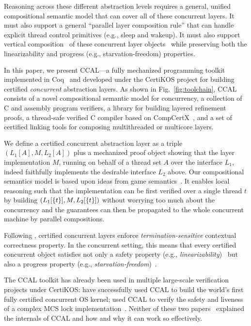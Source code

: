 Reasoning across these different abstraction levels requires a
general, unified compositional semantic model that can cover all of
these concurrent layers. It must also support a general ``parallel
layer composition rule'' that can handle explicit thread control
primitives (e.g., sleep and wakeup). It must also support
vertical composition~\cite{ospp11} of these concurrent layer
objects~\cite{Herlihy08book} while preserving both the
linearizability and progress (e.g., starvation-freedom) properties.


In this paper, we present CCAL---a fully mechanized
programming toolkit implemented in
Coq~\cite{coq} and developed under the CertiKOS project \cite{certikos-osdi16} for building certified {\em concurrent}
abstraction layers.  
As shown in Fig.~\ref{fig:toolchain}, CCAL consists of a novel
compositional semantic model for concurrency, a collection of C and
assembly program verifiers, a library for building layered refinement
proofs, a thread-safe verified C compiler based on
CompCertX~\cite{dscal15}, and a set of certified linking tools for
composing multithreaded or multicore layers.

We define a certified  concurrent abstraction layer
as a triple $(L_1[A],M,L_2[A])$ plus a mechanized proof object showing that the layer implementation $M$, running on behalf of a thread set $A$ over the interface $L_1$, indeed faithfully implements the desirable interface $L_2$
above. Our compositional semantics model  is based upon
ideas from game semantics~\cite{gsinvite}. It
enables local reasoning such that  the implementation can be first verified over a single thread $t$ by building $(L_1[\{t\}], M,L_2[\{t\}])$ without worrying too much about the concurrency
and the guarantees can then be propagated to the whole concurrent machine by parallel compositions. 

Following \citet{dscal15}, certified concurrent layers enforce {\em
  termination-sensitive} contextual correctness property. In the
concurrent setting, this means that every certified concurrent object
satisfies not only a safety property (e.g., {\em
  linearizability})~\cite{herlihy90,filipovic10} but also a progress
property (e.g., {\em starvation-freedom})~\cite{liang13}.

The CCAL toolkit has already been used in multiple
large-scale verification projects under CertiKOS: \citet{certikos-osdi16} have
successfully used CCAL to build the world's first fully certified
concurrent OS kernel; \citet{cpp-mcs-lock} used CCAL to verify the
safety and liveness of a complex MCS lock
implementation~\cite{mcs91}. Neither of these two
papers~\cite{certikos-osdi16,cpp-mcs-lock} explained the internals of
CCAL and how and why it can work so effectively.

